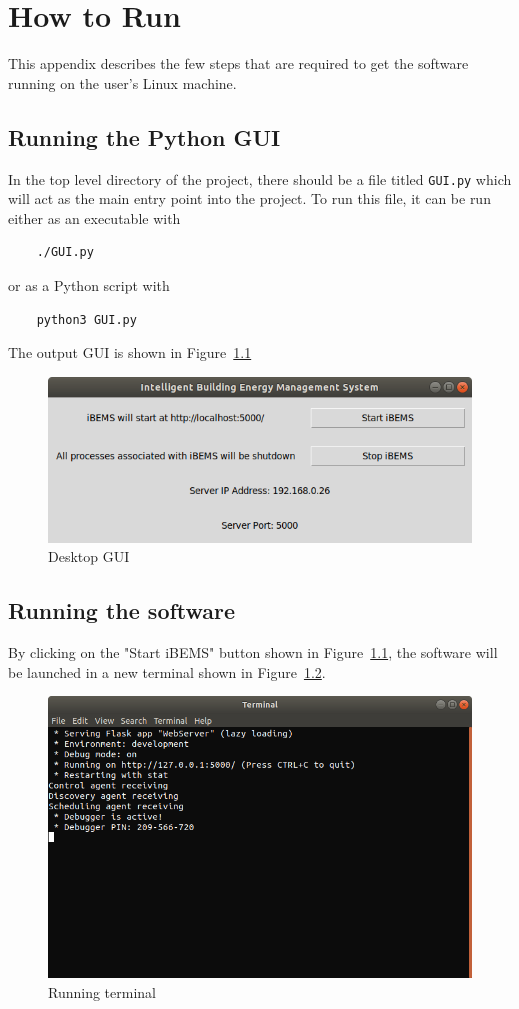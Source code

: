 \chapter{How to Run}
\label{ap: appendixB}

This appendix describes the few steps that are required to get the software running on the user's Linux machine.

\section{Running the Python GUI}
In the top level directory of the project, there should be a file titled \texttt{GUI.py} which will act as the main entry point into the project. To run this file, it can be run either as an executable with
\begin{verbatim}
    ./GUI.py
\end{verbatim}
or as a Python script with
\begin{verbatim}
    python3 GUI.py
\end{verbatim}
The output GUI is shown in Figure~\ref{fig:desktopGUI}
\begin{figure}[H]
    \centering
    \includegraphics[scale=0.5]{figs/desktopGUI.png}
    \caption{Desktop GUI}
    \label{fig:desktopGUI}
\end{figure}

\section{Running the software}
By clicking on the "Start iBEMS" button shown in Figure~\ref{fig:desktopGUI}, the software will be launched in a new terminal shown in Figure~\ref{fig:runningterminal}.
\begin{figure}[H]
    \centering
    \includegraphics[scale=0.4]{figs/runningterminal.png}
    \caption{Running terminal}
    \label{fig:runningterminal}
\end{figure}
